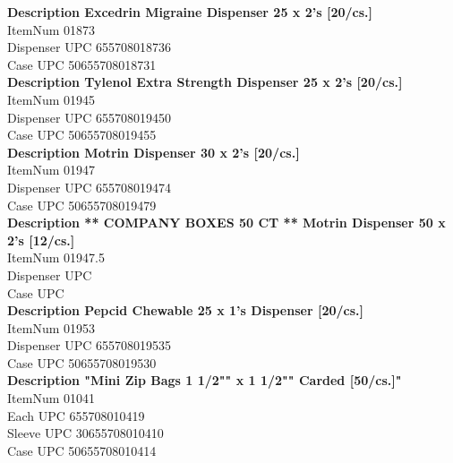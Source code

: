 \documentclass{article}
\begin{document}
{\bfseries Description		 Excedrin Migraine Dispenser 25 x 2's [20/cs.]               }\\
ItemNum\hspace{2cm}   01873  \\
Dispenser UPC\hspace{2cm}    655708018736  \\
Case UPC\hspace{2cm}    50655708018731  \\


{\bfseries Description		 Tylenol Extra Strength Dispenser 25 x 2's [20/cs.]          }\\
ItemNum\hspace{2cm}   01945  \\
Dispenser UPC\hspace{2cm}    655708019450  \\
Case UPC\hspace{2cm}    50655708019455  \\


{\bfseries Description		Motrin Dispenser 30 x 2's [20/cs.]                           }\\
ItemNum\hspace{2cm}   01947  \\
Dispenser UPC\hspace{2cm}    655708019474  \\
Case UPC\hspace{2cm}    50655708019479  \\


{\bfseries Description		** COMPANY BOXES 50 CT ** Motrin Dispenser 50 x 2's [12/cs.] }\\
ItemNum\hspace{2cm}   01947.5  \\
Dispenser UPC\hspace{2cm}      \\
Case UPC\hspace{2cm}      \\


{\bfseries Description		Pepcid Chewable 25 x 1's Dispenser [20/cs.]                  }\\
ItemNum\hspace{2cm}   01953  \\
Dispenser UPC\hspace{2cm}    655708019535  \\
Case UPC\hspace{2cm}    50655708019530  \\


{\bfseries Description		"Mini Zip Bags 1 1/2"" x 1 1/2"" Carded [50/cs.]" }\\
ItemNum\hspace{2cm}           01041  \\
Each UPC  \hspace{2cm}    655708010419  \\
Sleeve UPC\hspace{2cm}    30655708010410  \\
Case UPC\hspace{2cm}    50655708010414  \\
\end{document}
